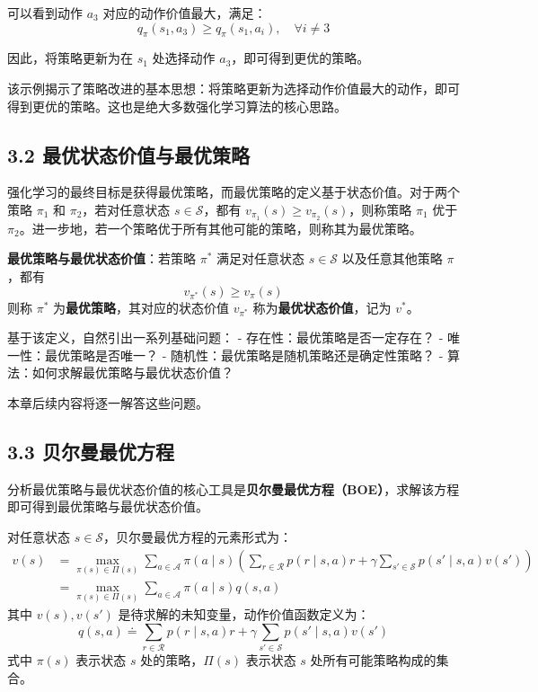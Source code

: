 \documentclass[UTF8]{article}
\begin{document}
可以看到动作 $a_3$ 对应的动作价值最大，满足：
\[
q_\pi(s_1, a_3) \geq q_\pi(s_1, a_i), \quad \forall i \neq 3
\]

因此，将策略更新为在 $s_1$ 处选择动作 $a_3$，即可得到更优的策略。

该示例揭示了策略改进的基本思想：将策略更新为选择动作价值最大的动作，即可得到更优的策略。这也是绝大多数强化学习算法的核心思路。

\subsection*{3.2 最优状态价值与最优策略}

强化学习的最终目标是获得最优策略，而最优策略的定义基于状态价值。对于两个策略 $\pi_1$ 和 $\pi_2$，若对任意状态 $s \in \mathcal{S}$，都有 $v_{\pi_1}(s) \geq v_{\pi_2}(s)$，则称策略 $\pi_1$ 优于 $\pi_2$。进一步地，若一个策略优于所有其他可能的策略，则称其为最优策略。

\begin{definitionbox}
    \textbf{最优策略与最优状态价值}：若策略 $\pi^*$ 满足对任意状态 $s \in \mathcal{S}$ 以及任意其他策略 $\pi$，都有
    \[
    v_{\pi^*}(s) \geq v_\pi(s)
    \]
    则称 $\pi^*$ 为\textbf{最优策略}，其对应的状态价值 $v_{\pi^*}$ 称为\textbf{最优状态价值}，记为 $v^*$。
\end{definitionbox}

基于该定义，自然引出一系列基础问题：
- 存在性：最优策略是否一定存在？
- 唯一性：最优策略是否唯一？
- 随机性：最优策略是随机策略还是确定性策略？
- 算法：如何求解最优策略与最优状态价值？

本章后续内容将逐一解答这些问题。

\subsection*{3.3 贝尔曼最优方程}

分析最优策略与最优状态价值的核心工具是\textbf{贝尔曼最优方程（BOE）}，求解该方程即可得到最优策略与最优状态价值。

对任意状态 $s \in \mathcal{S}$，贝尔曼最优方程的元素形式为：
\begin{equation}
\label{eq:boe_element}
\begin{aligned}
v(s) &= \max_{\pi(s) \in \Pi(s)} \sum_{a \in \mathcal{A}} \pi(a \mid s) \left( \sum_{r \in \mathcal{R}} p(r \mid s, a) r + \gamma \sum_{s' \in \mathcal{S}} p(s' \mid s, a) v(s') \right) \\
&= \max_{\pi(s) \in \Pi(s)} \sum_{a \in \mathcal{A}} \pi(a \mid s) q(s, a)
\end{aligned}
\end{equation}
其中 $v(s), v(s')$ 是待求解的未知变量，动作价值函数定义为：
\[
q(s, a) \doteq \sum_{r \in \mathcal{R}} p(r \mid s, a) r + \gamma \sum_{s' \in \mathcal{S}} p(s' \mid s, a) v(s')
\]
式中 $\pi(s)$ 表示状态 $s$ 处的策略，$\Pi(s)$ 表示状态 $s$ 处所有可能策略构成的集合。
\end{document}
